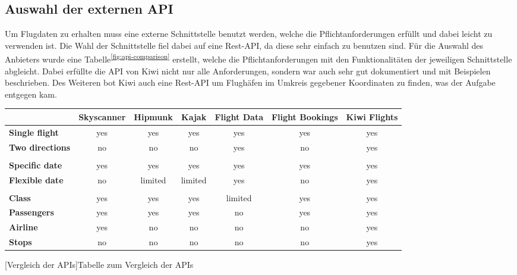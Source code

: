 \documentclass[12pt,twoside,a4paper]{article}
\begin{document}
\subsection{Auswahl der externen API}
Um Flugdaten zu erhalten muss eine externe Schnittstelle benutzt werden, welche die Pflichtanforderungen erfüllt und dabei leicht zu verwenden ist. Die Wahl der Schnittstelle fiel dabei auf eine Rest-API, da diese sehr einfach zu benutzen sind. Für die Auswahl des Anbieters wurde eine Tabelle\textsuperscript{\ref{fig:api-comparison}} erstellt, welche die Pflichtanforderungen mit den Funktionalitäten der jeweiligen Schnittstelle abgleicht. Dabei erfüllte die API von Kiwi nicht nur alle Anforderungen, sondern war auch sehr gut dokumentiert und mit Beispielen beschrieben. Des Weiteren bot Kiwi auch eine Rest-API um Flughäfen im Umkreis gegebener Koordinaten zu finden, was der Aufgabe entgegen kam.
\begin{center}
	\captionsetup{type=figure}
	\resizebox{\textwidth}{!}
	{\begin{tabular}{ l | c | c | c | c | c | c }
		& \textbf{Skyscanner} & \textbf{Hipmunk} & \textbf{Kajak} & \textbf{Flight Data} & \textbf{Flight Bookings} & \textbf{Kiwi Flights}\\
		\hline
		\textbf{Single flight} & \cellcolor{green!50}yes & \cellcolor{green!50}yes & \cellcolor{green!50}yes & \cellcolor{green!50}yes & \cellcolor{green!50}yes & \cellcolor{green!50}yes\\
		\hline
		\textbf{Two directions} & \cellcolor{red!75}no & \cellcolor{red!75}no & \cellcolor{red!75}no & \cellcolor{green!50}yes & \cellcolor{red!75}no & \cellcolor{green!50}yes\\
		\hline
		& & & & & &\\
		\hline
		\textbf{Specific date} & \cellcolor{green!50}yes & \cellcolor{green!50}yes & \cellcolor{green!50}yes & \cellcolor{green!50}yes & \cellcolor{green!50}yes & \cellcolor{green!50}yes\\
		\hline
		\textbf{Flexible date} & \cellcolor{red!75}no & \cellcolor{yellow!75}limited & \cellcolor{yellow!75}limited & \cellcolor{green!50}yes & \cellcolor{red!75}no & \cellcolor{green!50}yes\\
		\hline
		& & & & & &\\
		\hline
		\textbf{Class} & \cellcolor{green!50}yes & \cellcolor{green!50}yes & \cellcolor{green!50}yes & \cellcolor{yellow!75}limited & \cellcolor{green!50}yes & \cellcolor{green!50}yes\\
		\hline
		\textbf{Passengers} & \cellcolor{green!50}yes & \cellcolor{green!50}yes & \cellcolor{green!50}yes & \cellcolor{red!75}no & \cellcolor{green!50}yes & \cellcolor{green!50}yes\\
		\hline
		\textbf{Airline} & \cellcolor{green!50}yes & \cellcolor{red!75}no & \cellcolor{red!75}no & \cellcolor{red!75}no & \cellcolor{red!75}no & \cellcolor{green!50}yes\\
		\hline
		\textbf{Stops} & \cellcolor{red!75}no & \cellcolor{red!75}no & \cellcolor{red!75}no & \cellcolor{red!75}no & \cellcolor{red!75}no & \cellcolor{green!50}yes
	\end{tabular}}
	[Vergleich der APIs]{Tabelle zum Vergleich der APIs}
	\label{fig:api-comparison}
\end{center}
\end{document}
